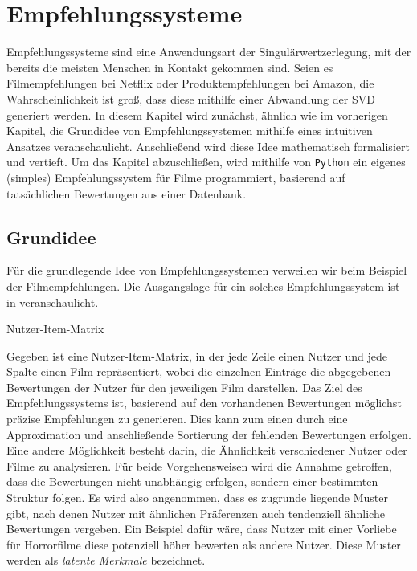 \chapter{Empfehlungssysteme}\label{chap:rec}

Empfehlungssysteme sind eine Anwendungsart der Singulärwertzerlegung, mit der bereits die meisten Menschen in Kontakt gekommen sind.
Seien es Filmempfehlungen bei Netflix oder Produktempfehlungen bei Amazon, die Wahrscheinlichkeit ist groß, dass diese mithilfe einer Abwandlung der SVD generiert werden.
In diesem Kapitel wird zunächst, ähnlich wie im vorherigen Kapitel, die Grundidee von Empfehlungssystemen mithilfe eines intuitiven Ansatzes veranschaulicht.
Anschließend wird diese Idee mathematisch formalisiert und vertieft.
Um das Kapitel abzuschließen, wird mithilfe von \texttt{Python} ein eigenes (simples) Empfehlungssystem für Filme programmiert, basierend auf tatsächlichen Bewertungen aus einer Datenbank.

\section{Grundidee}

Für die grundlegende Idee von Empfehlungssystemen verweilen wir beim Beispiel der Filmempfehlungen.
Die Ausgangslage für ein solches Empfehlungssystem ist in  veranschaulicht.
\begin{table}[tb]
    \centering
    \caption{Nutzer-Item-Matrix}\label{tab:rec:usit}
    
\end{table}

Gegeben ist eine Nutzer-Item-Matrix, in der jede Zeile einen Nutzer und jede Spalte einen Film repräsentiert, wobei die einzelnen Einträge die abgegebenen Bewertungen der Nutzer für den jeweiligen Film darstellen.
Das Ziel des Empfehlungssystems ist, basierend auf den vorhandenen Bewertungen möglichst präzise Empfehlungen zu generieren.
Dies kann zum einen durch eine Approximation und anschließende Sortierung der fehlenden Bewertungen erfolgen.
Eine andere Möglichkeit besteht darin, die Ähnlichkeit verschiedener Nutzer oder Filme zu analysieren.
Für beide Vorgehensweisen wird die Annahme getroffen, dass die Bewertungen nicht unabhängig erfolgen, sondern einer bestimmten Struktur folgen.
Es wird also angenommen, dass es zugrunde liegende Muster gibt, nach denen Nutzer mit ähnlichen Präferenzen auch tendenziell ähnliche Bewertungen vergeben.
Ein Beispiel dafür wäre, dass Nutzer mit einer Vorliebe für Horrorfilme diese potenziell höher bewerten als andere Nutzer.
Diese Muster werden als \emph{latente Merkmale} bezeichnet.

